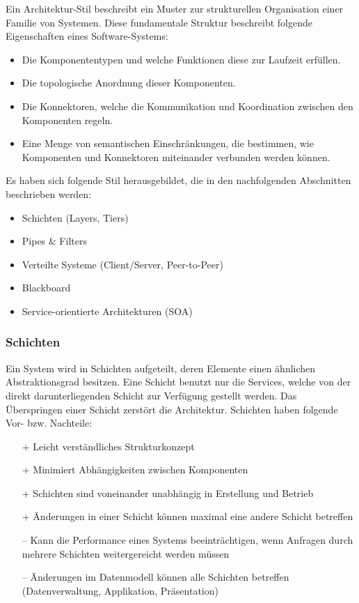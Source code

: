 Ein Architektur-Stil beschreibt ein Muster zur strukturellen Organisation einer Familie von Systemen. Diese fundamentale Struktur beschreibt folgende Eigenschaften eines Software-Systems:
\begin{itemize}
	\item Die Komponententypen und welche Funktionen diese zur Laufzeit erfüllen.
	\item Die topologische Anordnung dieser Komponenten.
	\item Die Konnektoren, welche die Kommunikation und Koordination zwischen den Komponenten regeln.
	\item Eine Menge von semantischen Einschränkungen, die bestimmen, wie Komponenten und Konnektoren miteinander verbunden werden können.
\end{itemize}
Es haben sich folgende Stil herausgebildet, die in den nachfolgenden Abschnitten beschrieben werden:
\begin{itemize}
	\item Schichten (Layers, Tiers)
	\item Pipes \& Filters
	\item Verteilte Systeme (Client/Server, Peer-to-Peer)
	\item Blackboard
	\item Service-orientierte Architekturen (SOA)
\end{itemize}

\subsubsection{Schichten}

Ein System wird in Schichten aufgeteilt, deren Elemente einen ähnlichen Abstraktionsgrad besitzen. Eine Schicht benutzt nur die Services, welche von der direkt darunterliegenden Schicht zur Verfügung gestellt werden. Das Überspringen einer Schicht zerstört die Architektur.  Schichten haben folgende Vor- bzw. Nachteile:
\begin{itemize}
	\item[+] Leicht verständliches Strukturkonzept
	\item[+] Minimiert Abhängigkeiten zwischen Komponenten
	\item[+] Schichten sind voneinander unabhängig in Erstellung und Betrieb
	\item[+] Änderungen in einer Schicht können maximal eine andere Schicht betreffen
	\item[--] Kann die Performance eines Systems beeinträchtigen, wenn Anfragen durch mehrere Schichten weitergereicht werden müssen
	\item[--] Änderungen im Datenmodell können alle Schichten betreffen (Datenverwaltung, Applikation, Präsentation)
\end{itemize}

